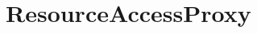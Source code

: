 \href{https://api.travis-ci.org/symbiote-h2020/ResourceAccessProxy}{\tt } \href{https://codecov.io/github/symbiote-h2020/ResourceAccessProxy}{\tt }

\section*{Resource\+Access\+Proxy}